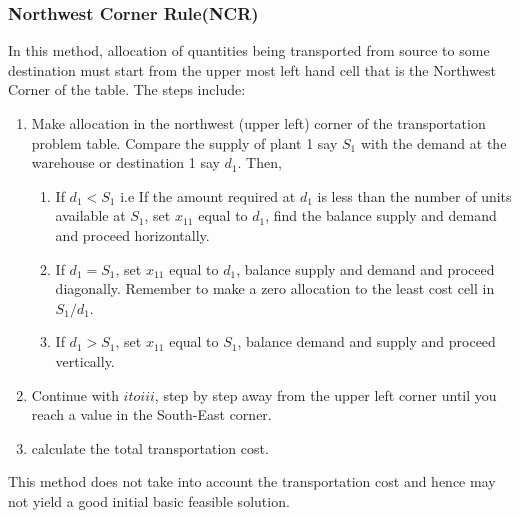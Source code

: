 \documentclass[12pt]{report}
\begin{document}
	\subsubsection{Northwest Corner Rule(NCR)} 
	In this method, allocation of quantities being transported from source to some destination must start from the upper most left hand cell that is the Northwest Corner of the table. The steps include:
	\begin{enumerate}
		\renewcommand{\labelenumi}{(\alph{enumi})}
		\item Make allocation in the northwest (upper left) corner of the transportation problem table. Compare the supply of plant 1 say $S_1$ with the demand at the warehouse or destination 1 say $d_1$. Then,
		
		\begin{enumerate}
			\renewcommand{\labelenumii}{(\roman{enumii})}
			\item If $d_1 < S_1$ i.e If the amount required at $d_1$ is less than the number of units available at $S_1$, set $x_{11}$ equal to $d_{1}$, find the balance supply and demand and proceed horizontally.
			
			\item If $d_1 = S_1$, set $x_{11}$ equal to $d_1$, balance supply and demand and proceed diagonally. Remember to make a zero allocation to the least cost cell in $S_1/d_1$.
			
			\item If $d_1 > S_1$, set $x_{11}$ equal to $S_1$, balance demand and supply and proceed vertically.
		\end{enumerate}
	
		\item Continue with $i to iii$, step by step away from the upper left corner until you reach a value in the South-East corner.
		
		\item calculate the total transportation cost.
	\end{enumerate}
	This method does not take into account the transportation cost and hence may not yield a good initial basic feasible solution.
	
\end{document}
